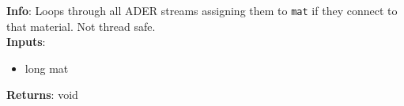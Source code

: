 \textbf{Info}: Loops through all ADER streams assigning them to \texttt{mat} if
they connect to that material. Not thread safe.\\

\noindent \textbf{Inputs}:
\begin{itemize}
\item{long mat}
\end{itemize}

\noindent \textbf{Returns}: void
